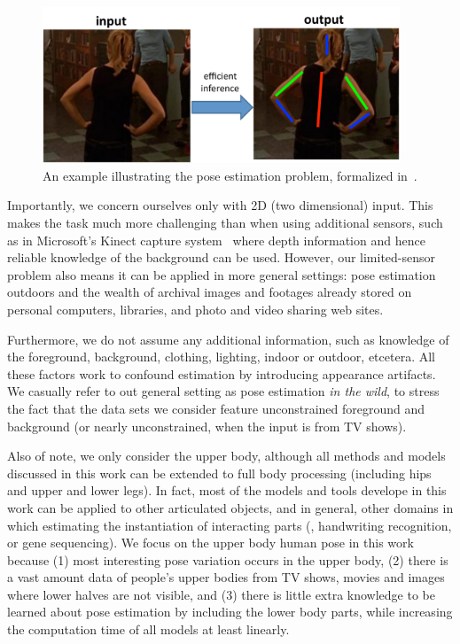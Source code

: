 \begin{figure}[tb]
\begin{center}
\includegraphics[width=0.95\textwidth]{figs/problem-statement.pdf}
\caption[Statement of problem.]{An example illustrating the pose estimation 
problem, formalized in~.}
\label{fig:pose-problem}
\end{center}
\end{figure}

Importantly, we concern ourselves only with 2D (two dimensional) input.  This 
makes the task much more challenging than when using additional sensors, such 
as in Microsoft's Kinect capture system~\citep{kinect} where depth information 
and hence reliable knowledge of the background can be used.  However, our 
limited-sensor problem also means it can be applied in more general settings: 
pose estimation outdoors and the wealth of archival images and footages already 
stored on personal computers, libraries, and photo and video sharing web sites.  

Furthermore, we do not assume any additional information, such as knowledge of 
the foreground, background, clothing, lighting, indoor or outdoor, etcetera.  
All these factors work to confound estimation by introducing appearance 
artifacts.  We casually refer to out general setting as pose estimation {\em in 
the wild}, to stress the fact that the data sets we consider feature 
unconstrained foreground and background (or nearly unconstrained, when the 
input is from TV shows).

Also of note, we only consider the upper body, although all methods and models 
discussed in this work can be extended to full body processing (\ie including 
hips and upper and lower legs).  In fact, most of the models and tools develope 
in this work can be applied to other articulated objects, and in general, other 
domains in which estimating the instantiation of interacting parts (\eg, 
handwriting recognition, or gene sequencing). We focus on the upper body human 
pose in this work because (1) most interesting pose variation occurs in the 
upper body, (2) there is a vast amount data of people's upper bodies from TV 
shows, movies and images where lower halves are not visible, and (3) there is 
little extra knowledge to be learned about pose estimation by including the 
lower body parts, while increasing the computation time of all models at least 
linearly.  

